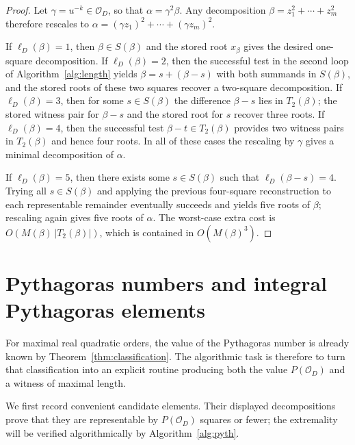 \documentclass[manuscript,screen]{acmart}
\theoremstyle{plain}
\theoremstyle{definition}
\theoremstyle{nonitalicremark}
\newcommand{\OD}{\mathcal{O}_D}
\newcommand{\len}{\ell}
\begin{document}
\begin{proof}
Let $\gamma=u^{-k}\in\OD$, so that $\alpha=\gamma^2\beta$. Any decomposition
$\beta=z_1^2+\cdots+z_m^2$ therefore rescales to
$\alpha=(\gamma z_1)^2+\cdots+(\gamma z_m)^2$.

If $\len_D(\beta)=1$, then $\beta\in S(\beta)$ and the stored root $x_\beta$ gives the desired
one-square decomposition. If $\len_D(\beta)=2$, then the successful test in the second loop of
Algorithm~\ref{alg:length} yields $\beta=s+(\beta-s)$ with both summands in $S(\beta)$, and the
stored roots of these two squares recover a two-square decomposition. If $\len_D(\beta)=3$, then
for some $s\in S(\beta)$ the difference $\beta-s$ lies in $T_2(\beta)$; the stored witness pair for
$\beta-s$ and the stored root for $s$ recover three roots. If $\len_D(\beta)=4$, then the
successful test $\beta-t\in T_2(\beta)$ provides two witness pairs in $T_2(\beta)$ and hence four
roots. In all of these cases the rescaling by $\gamma$ gives a minimal decomposition of $\alpha$.

If $\len_D(\beta)=5$, then there exists some $s\in S(\beta)$ such that $\len_D(\beta-s)=4$.
Trying all $s\in S(\beta)$ and applying the previous four-square reconstruction to each
representable remainder eventually succeeds and yields five roots of $\beta$; rescaling again gives
five roots of $\alpha$. The worst-case extra cost is $O(M(\beta)\,|T_2(\beta)|)$, which is
contained in $O(M(\beta)^3)$.
\end{proof}

\section{Pythagoras numbers and integral Pythagoras elements}\label{sec:pythagoras}
For maximal real quadratic orders, the value of the Pythagoras number is already known by
Theorem~\ref{thm:classification}. The algorithmic task is therefore to turn that classification
into an explicit routine producing both the value $P(\OD)$ and a witness of maximal length.

We first record convenient candidate elements. Their displayed decompositions prove that they are
representable by $P(\OD)$ squares or fewer; the extremality will be verified algorithmically by
Algorithm~\ref{alg:pyth}.
\end{document}
